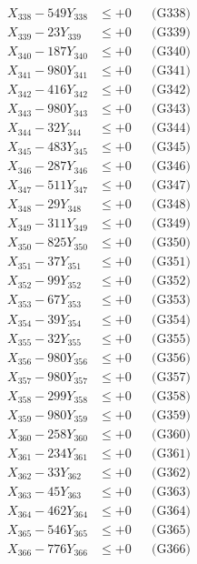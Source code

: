 \documentclass[a4paper,10pt]{article}
\begin{document}
{\begin{align}
X_{338} - 549Y_{338} &\leq +0 && \text{(G338)} \\
X_{339} - 23Y_{339} &\leq +0 && \text{(G339)} \\
X_{340} - 187Y_{340} &\leq +0 && \text{(G340)} \\
\allowbreak
X_{341} - 980Y_{341} &\leq +0 && \text{(G341)} \\
X_{342} - 416Y_{342} &\leq +0 && \text{(G342)} \\
X_{343} - 980Y_{343} &\leq +0 && \text{(G343)} \\
X_{344} - 32Y_{344} &\leq +0 && \text{(G344)} \\
X_{345} - 483Y_{345} &\leq +0 && \text{(G345)} \\
X_{346} - 287Y_{346} &\leq +0 && \text{(G346)} \\
X_{347} - 511Y_{347} &\leq +0 && \text{(G347)} \\
X_{348} - 29Y_{348} &\leq +0 && \text{(G348)} \\
X_{349} - 311Y_{349} &\leq +0 && \text{(G349)} \\
X_{350} - 825Y_{350} &\leq +0 && \text{(G350)} \\
\allowbreak
X_{351} - 37Y_{351} &\leq +0 && \text{(G351)} \\
X_{352} - 99Y_{352} &\leq +0 && \text{(G352)} \\
X_{353} - 67Y_{353} &\leq +0 && \text{(G353)} \\
X_{354} - 39Y_{354} &\leq +0 && \text{(G354)} \\
X_{355} - 32Y_{355} &\leq +0 && \text{(G355)} \\
X_{356} - 980Y_{356} &\leq +0 && \text{(G356)} \\
X_{357} - 980Y_{357} &\leq +0 && \text{(G357)} \\
X_{358} - 299Y_{358} &\leq +0 && \text{(G358)} \\
X_{359} - 980Y_{359} &\leq +0 && \text{(G359)} \\
X_{360} - 258Y_{360} &\leq +0 && \text{(G360)} \\
\allowbreak
X_{361} - 234Y_{361} &\leq +0 && \text{(G361)} \\
X_{362} - 33Y_{362} &\leq +0 && \text{(G362)} \\
X_{363} - 45Y_{363} &\leq +0 && \text{(G363)} \\
X_{364} - 462Y_{364} &\leq +0 && \text{(G364)} \\
X_{365} - 546Y_{365} &\leq +0 && \text{(G365)} \\
X_{366} - 776Y_{366} &\leq +0 && \text{(G366)} \\

\end{align}}
\end{document}

